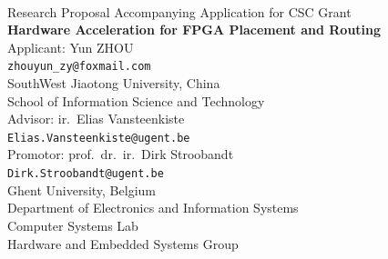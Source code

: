 \documentclass[a4paper,oneside,12pt]{article}
\begin{document}

\thispagestyle{empty}

\begin{center}
\mbox{}\\\vspace{5mm}
{\large Research Proposal Accompanying Application for CSC Grant}\\ [45mm]
%
{\bf\Large Hardware Acceleration for FPGA Placement and Routing} \\
\vspace{45mm}
\large Applicant: Yun ZHOU \\
\vspace{2mm}
\small\texttt{zhouyun\_zy@foxmail.com} \\
\vspace{10mm}
\normalsize SouthWest Jiaotong University, China \\
\normalsize School of Information Science and Technology\\
\vspace{10mm}
\large Advisor: ir.\ Elias Vansteenkiste \\
\small\texttt{Elias.Vansteenkiste@ugent.be} \\
\vspace{2mm}
\large Promotor: prof.\ dr.\ ir.\ Dirk Stroobandt \\
\small\texttt{Dirk.Stroobandt@ugent.be} \\
\vspace{10mm}
\normalsize Ghent University, Belgium \\
\normalsize Department of Electronics and Information Systems\\
\normalsize Computer Systems Lab\\
\normalsize Hardware and Embedded Systems Group
\end{center}

\newpage

\tableofcontents
\end{document}
